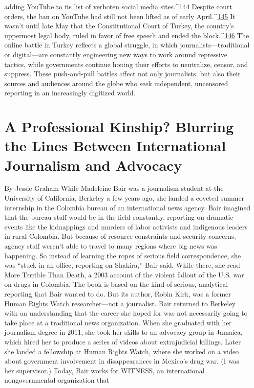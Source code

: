 adding YouTube to its list of verboten social media sites.^{\href{#endnotes}{144}} Despite court orders, the ban
on YouTube had still not been lifted as of early April.^{\href{#endnotes}{145}} It wasn’t until late May that the
Constitutional Court of Turkey, the country’s uppermost legal body, ruled in favor of free
speech and ended the block.^{\href{#endnotes}{146}}
The online battle in Turkey reflects a global struggle, in which journalists—traditional or
digital—are constantly engineering new ways to work around repressive tactics, while
governments continue honing their efforts to neutralize, censor, and suppress. These
push-and-pull battles affect not only journalists, but also their sources and audiences
around the globe who seek independent, uncensored reporting in an increasingly digitized
world.
\chapter{A Professional Kinship? Blurring the Lines Between International Journalism and Advocacy}
By Jessie Graham
While Madeleine Bair was a journalism student at the University of California, Berkeley
a few years ago, she landed a coveted summer internship in the Colombia bureau of an
international news agency. Bair imagined that the bureau staff would be in the field
constantly, reporting on dramatic events like the kidnappings and murders of labor
activists and indigenous leaders in rural Colombia. But because of resource constraints
and security concerns, agency staff weren’t able to travel to many regions where big
news was happening.
So instead of learning the ropes of serious field correspondence, she was ``stuck in an
office, reporting on Shakira,'' Bair said. While there, she read More Terrible Than Death,
a 2003 account of the violent fallout of the U.S. war on drugs in Colombia. The book is
based on the kind of serious, analytical reporting that Bair wanted to do. But its author,
Robin Kirk, was a former Human Rights Watch researcher—not a journalist.
Bair returned to Berkeley with an understanding that the career she hoped for was not
necessarily going to take place at a traditional news organization. When she graduated
with her journalism degree in 2011, she took her skills to an advocacy group in Jamaica,
which hired her to produce a series of videos about extrajudicial killings. Later she
landed a fellowship at Human Rights Watch, where she worked on a video about
government involvement in disappearances in Mexico’s drug war. (I was her supervisor.)
Today, Bair works for WITNESS, an international nongovernmental organization that
